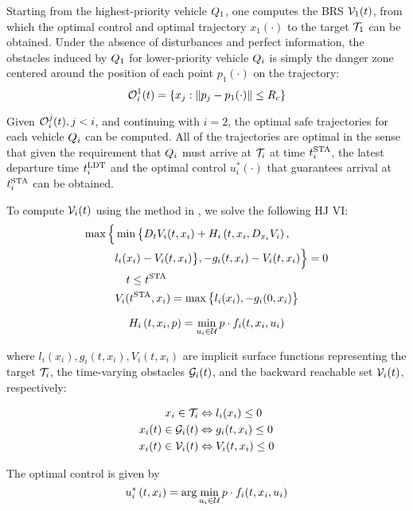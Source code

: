 Starting from the highest-priority vehicle $Q_1$, one computes the BRS $\mathcal{V}_1(t)$, from which the optimal control and optimal trajectory $x_1(\cdot)$ to the target $\mathcal{T}_1$ can be obtained. Under the absence of disturbances and perfect information, the obstacles induced by $Q_1$ for lower-priority vehicle $Q_i$ is simply the danger zone centered around the position of each point $p_1(\cdot)$ on the trajectory:
\vspace{-0.5em} 
\begin{equation}
\mathcal{O}_i^1(t) = \{x_j: \|p_j - p_1(\cdot)\|\le R_c\}
\end{equation}

Given $\mathcal{O}_i^j(t), j<i$, and continuing with $i = 2$, the optimal safe trajectories for each vehicle $Q_i$ can be computed. All of the trajectories are optimal in the sense that given the requirement that $Q_i$ must arrive at $\mathcal{T}_i$ at time $t^\text{STA}_i$, the latest departure time $t^\text{LDT}_i$ and the optimal control $u^*_i(\cdot)$ that guarantees arrival at $t^\text{STA}_i$ can be obtained.

To compute $\mathcal{V}_i(t)$ using the method in \cite{Fisac15}, we solve the following HJ VI:
\vspace{-0.5em} 
\begin{equation}
\label{eq:HJIVI}
\begin{aligned}
\max\Big\{&\min\big\{D_t V_i(t, x_i) + H_i\left(t, x_i, D_{x_i} V_i\right), \\
&l_i(x_i) - V_i(t, x_i)\big\}, -g_i(t, x_i) - V_i(t, x_i)\Big\} = 0 \\
&\quad t\le t^\text{STA}\\
&V_i(t^\text{STA}, x_i) = \max\big\{l_i(x_i), -g_i(0, x_i)\big\}\\ 
\end{aligned}
\end{equation}

\begin{equation}
H_i\left(t, x_i, p\right) = \min_{u_i \in \mathcal{U}} p \cdot f_i(t, x_i, u_i)
\end{equation}

\noindent where $l_i(x_i), g_i(t,x_i),V_i(t,x_i)$ are implicit surface functions representing the target $\mathcal{T}_i$, the time-varying obstacles $\mathcal{G}_i(t)$, and the backward reachable set $\mathcal{V}_i(t)$, respectively: 

\begin{equation}
\label{eq:impl_surf}
\begin{aligned}
x_i \in \mathcal{T}_i &\Leftrightarrow l_i(x_i) \le 0 \\
x_i(t) \in \mathcal{G}_i(t) &\Leftrightarrow g_i(t,x_i) \le 0 \\
x_i(t) \in \mathcal{V}_i(t) &\Leftrightarrow V_i(t, x_i) \le 0
\end{aligned}
\end{equation}

The optimal control is given by
 \vspace{-0.4em} 
\begin{equation}
\label{eq:optCtrl}
u^*_i\left(t, x_i\right) = \arg \min_{u_i \in \mathcal{U}} p \cdot f_i(t, x_i, u_i)
\end{equation}